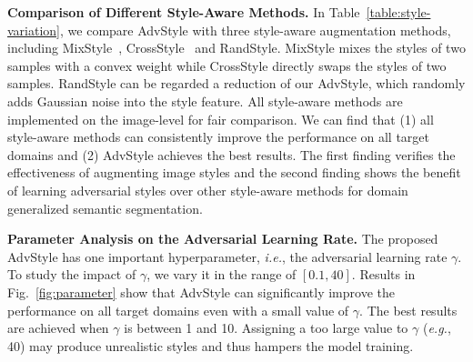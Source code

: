 \documentclass{article}
\newcommand{\ours}{AdvStyle\xspace}
\begin{document}
\textbf{Comparison of Different Style-Aware Methods.} In Table~\ref{table:style-variation}, we compare \ours with three style-aware augmentation methods, including MixStyle~\cite{zhou2021mixstyle}, CrossStyle~\cite{crossnorm} and RandStyle. MixStyle mixes the styles of two samples with a convex weight while CrossStyle directly swaps the styles of two samples. RandStyle can be regarded a reduction of our \ours, which randomly adds Gaussian noise into the style feature. All style-aware methods are implemented on the image-level for fair comparison. We can find that (1) all style-aware methods can consistently improve the performance on all target domains and (2) \ours achieves the best results. The first finding verifies the effectiveness of augmenting image styles and the second finding shows the benefit of learning adversarial styles over other style-aware methods for domain generalized semantic segmentation.



\textbf{Parameter Analysis on the Adversarial Learning Rate.}
The proposed \ours has one important hyperparameter, \textit{i.e.}, the adversarial learning rate $\gamma$. To study the impact of $\gamma$, we vary it in the range of $[0.1, 40]$. Results in Fig.~\ref{fig:parameter} show that \ours can significantly improve the performance on all target domains even with a small value of $\gamma$. The best results are achieved when $\gamma$ is between 1 and 10. Assigning a too large value to $\gamma$ (\textit{e.g.}, 40) may produce unrealistic styles and thus hampers the model training.
\end{document}
